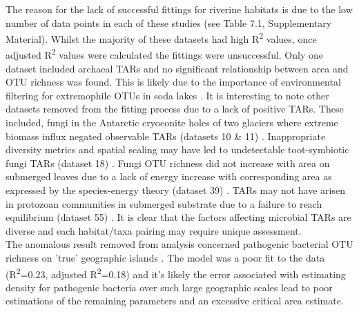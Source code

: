 


\noindent The reason for the lack of successful fittings for riverine habitats is due to the low number of data points in each of these studies (see Table 7.1, Supplementary Material). Whilst the majority of these datasets had high R\textsuperscript{2} values, once adjusted R\textsuperscript{2} values were calculated the fittings were unsuccessful. Only one dataset included archaeal TARs and no significant relationship between area and OTU richness was found. This is likely due to the importance of environmental filtering for extremophile OTUs in soda lakes \cite{LanzenAnders2013SPaE}. It is interesting to note other datasets removed from the fitting process due to a lack of positive TARs. These included, fungi in the Antarctic cryoconite holes of two glaciers where extreme biomass influx negated observable TARs (datasets 10 \& 11) \cite{darcy2018island}. Inappropriate diversity metrics and spatial scaling may have led to undetectable toot-symbiotic fungi TARs (dataset 18) \cite{davison2018microbial}. Fungi OTU richness did not increase with area on submerged leaves due to a lack of energy increase with corresponding area as expressed by the species-energy theory (dataset 39) \cite{FeinsteinLarryM2012Tran}  \cite{wright1983species}. TARs may not have arisen in protozoan communities in submerged substrate due to a failure to reach equilibrium (dataset 55) \cite{henebry1980effect}. It is clear that the factors affecting microbial TARs are diverse and each habitat/taxa pairing may require unique assessment. \\ 

\noindent The anomalous result removed from analysis concerned pathogenic bacterial OTU richness on 'true' geographic islands \cite{jean2016equilibrium}. The model was a poor fit to the data (R\textsuperscript{2}=0.23, adjusted R\textsuperscript{2}=0.18) and it's likely the error associated with estimating density for pathogenic bacteria over such large geographic scales lead to poor estimations of the remaining parameters and an excessive critical area estimate.   \\

